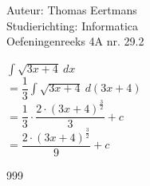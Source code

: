 \documentclass[a4paper]{article}
\begin{document}
  
\noindent \large Auteur: Thomas Eertmans \\
\noindent \large Studierichting: Informatica\\
\noindent \large Oefeningenreeks 4A nr. 29.2\\

\medskip

\normalsize

$\displaystyle\int \sqrt{3x+4} \ dx$ \\

$= \dfrac{1}{3} \displaystyle\int \sqrt{3x+4} \ d(3x+4)$ \\

$= \dfrac{1}{3} \cdot \dfrac{2 \cdot (3x+4)^{\tfrac{3}{2}}}{3} + c$ \\

$= \dfrac{2 \cdot (3x+4)^{\tfrac{3}{2}}}{9} + c$ 

\begin{thebibliography}{999}
\end{thebibliography}
\end{document}

